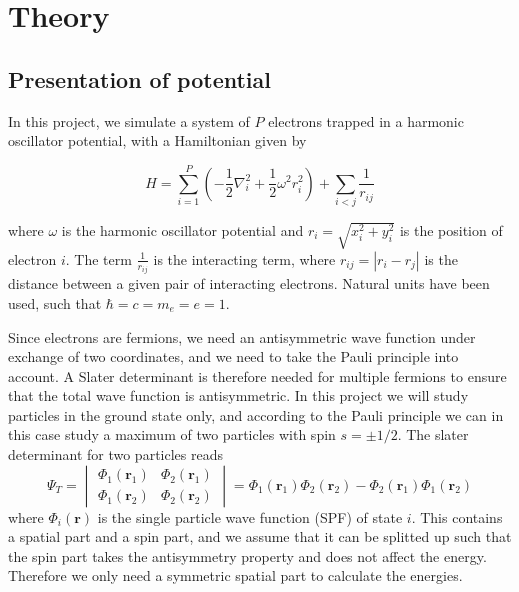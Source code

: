 \documentclass[norsk,a4paper,12pt]{article}
\begin{document}
 


\section{Theory} \label{sec:Theory}
\subsection{Presentation of potential} \label{sec:Presentation_of_potential}
In this project, we simulate a system of $P$ electrons trapped in a harmonic oscillator potential, with a Hamiltonian given by

\begin{equation}
\label{eq:Hamiltonian}
\hat{H} = \sum_{i=1}^{P} (-\frac{1}{2} \nabla_i^2 + \frac{1}{2} \omega^2 r_i ^2) + \sum_{i<j} \frac{1}{r_{ij}} 
\end{equation}

where $\omega$ is the harmonic oscillator potential and  $r_i = \sqrt{x_i^2 + y_i^2}$ is the position of electron $i$. The term $\frac{1}{r_{ij}}$ is the interacting term, where $r_{ij} = |r_i - r_j|$ is the distance between a given pair of interacting electrons. Natural units have been used, such that $\hbar = c = m_e = e = 1$.

Since electrons are fermions, we need an antisymmetric wave function under exchange of two coordinates, and we need to take the Pauli principle into account. A Slater determinant is therefore needed for multiple fermions to ensure that the total wave function is antisymmetric. In this project we will study particles in the ground state only, and according to the Pauli principle we can in this case study a maximum of two particles with spin $s=\pm 1/2$. The slater determinant for two particles reads
\begin{equation}
\Psi_T=
\begin{vmatrix}
\Phi_1(\boldsymbol{r}_1) & \Phi_2(\boldsymbol{r}_1)\\
\Phi_1(\boldsymbol{r}_2) & \Phi_2(\boldsymbol{r}_2)
\end{vmatrix}
=\Phi_1(\boldsymbol{r}_1)\Phi_2(\boldsymbol{r}_2)-\Phi_2(\boldsymbol{r}_1)\Phi_1(\boldsymbol{r}_2)
\end{equation}
where $\Phi_i(\boldsymbol{r})$ is the single particle wave function (SPF) of state $i$. This contains a spatial part and a spin part, and we assume that it can be splitted up such that the spin part takes the antisymmetry property and does not affect the energy. Therefore we only need a symmetric spatial part to calculate the energies.
\end{document}
